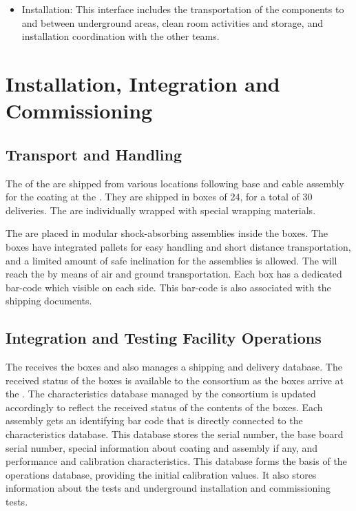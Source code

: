 \begin{itemize}
\item Installation: This interface %
includes the transportation of the  components to and between underground areas, clean room activities and storage, and installation coordination with the other teams. 

\end{itemize}

\section{Installation, Integration and Commissioning}
\label{sec:fddp-pd-9}

\subsection{Transport and Handling}
\label{sec:fddp-pd-9.1}

The \dpnumpmtch {} of the  are shipped from various locations following base and cable assembly for the  coating at the . %
They are shipped in boxes of \num{24}, for a total of \num{30} deliveries.
The  are individually wrapped with special wrapping materials. 

The  are placed in modular shock-absorbing assemblies inside the boxes. %
The boxes have integrated pallets for easy handling and short distance transportation, and a limited amount of safe inclination for the assemblies is allowed. The  will reach the  by means of air and ground transportation. Each box has a dedicated bar-code which visible on each side. This bar-code is also associated with the shipping documents. 

\subsection{Integration and Testing Facility Operations}
\label{sec:fddp-pd-9.2}

The  receives the  boxes and also manages a shipping and delivery database. The received status of the boxes is available to the \dual {} consortium as the boxes arrive at the . The  characteristics database managed by the \dual {} consortium is updated accordingly to reflect the received status of the contents of the boxes. Each  assembly gets an identifying bar code that is directly connected to the  characteristics database. This database stores the  serial number, the base board serial number, special information about  coating and assembly if any, and performance and calibration characteristics. This database  forms the basis of the operations database, providing the initial calibration values. It also stores information about the  tests and underground installation and commissioning tests.

